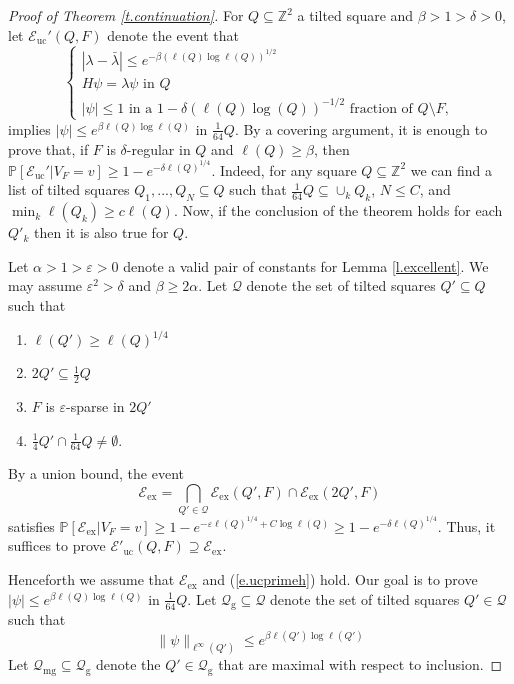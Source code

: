 \documentclass{amsart}
\newcommand{\eref}[1]{(\ref{e.#1})}
\newcommand{\tref}[1]{Theorem \ref{t.#1}}
\newcommand{\lref}[1]{Lemma \ref{l.#1}}
\numberwithin{equation}{section}
\numberwithin{figure}{section}
\newcommand{\Z}{\mathbb{Z}}
\renewcommand{\P}{\mathbb{P}}
\newcommand{\ep}{\varepsilon}
\begin{document}
\begin{proof}[Proof of \tref{continuation}]
For $Q \subseteq \Z^2$ a tilted square and $\beta > 1 > \delta > 0$, let $\mathcal E_{\mathrm{uc}}'(Q,F)$ denote the event that
\begin{equation}
\label{e.ucprimeh}
\begin{cases}
|\lambda - \bar \lambda| \leq e^{-\beta (\ell(Q) \log \ell(Q))^{1/2}} \\
H \psi = \lambda \psi \mbox{ in } Q \\
|\psi| \leq 1 \mbox{ in a $1-\delta (\ell(Q) \log(Q))^{-1/2}$ fraction of $Q \setminus F$},
\end{cases}
\end{equation}
implies $|\psi| \leq e^{\beta \ell(Q) \log \ell(Q)}$ in $\tfrac1{64} Q$.  By a covering argument, it is enough to prove that, if $F$ is $\delta$-regular in $Q$ and $\ell(Q) \geq \beta$, then $\P[\mathcal E_{\mathrm{uc}}' | V_F = v] \geq 1 - e^{-\delta \ell(Q)^{1/4}}$.  Indeed, for any square $Q \subseteq \Z^2$ we can find a list of tilted squares $Q_1, ..., Q_N \subseteq Q$ such that $\tfrac{1}{64} Q \subseteq \cup_k Q_k$, $N \leq C$, and $\min_k \ell(Q_k) \geq c \ell(Q)$.  Now, if the conclusion of the theorem holds for each $Q'_k$ then it is also true for $Q$.

Let $\alpha > 1 > \ep > 0$ denote a valid pair of constants for \lref{excellent}.  We may assume $\ep^2 > \delta$ and $\beta \geq 2 \alpha$.  Let $\mathcal Q$ denote the set of tilted squares $Q' \subseteq Q$ such that 
\begin{enumerate}
\item $\ell(Q') \geq \ell(Q)^{1/4}$
\item $2Q' \subseteq \tfrac12 Q$
\item $F$ is $\ep$-sparse in $2Q'$
\item $\tfrac14 Q' \cap \tfrac{1}{64} Q \neq \emptyset$.
\end{enumerate}
By a union bound, the event
\begin{equation*}
\mathcal E_{\mathrm{ex}} = \bigcap_{Q' \in \mathcal Q} \mathcal E_{\mathrm{ex}}(Q',F) \cap \mathcal E_{\mathrm{ex}}(2Q',F)
\end{equation*}
satisfies $\P[\mathcal E_{\mathrm{ex}} | V_F = v] \geq 1 - e^{-\ep \ell(Q)^{1/4} + C \log \ell(Q)} \geq 1 - e^{-\delta \ell(Q)^{1/4}}$.  Thus, it suffices to prove $\mathcal E'_{\mathrm{uc}}(Q,F) \supseteq \mathcal E_{\mathrm{ex}}$.

Henceforth we assume that $\mathcal E_{\mathrm{ex}}$ and \eref{ucprimeh} hold.  Our goal is to prove $|\psi| \leq e^{\beta \ell(Q) \log \ell(Q)}$ in $\tfrac{1}{64} Q$.  Let $\mathcal Q_{\mathrm{g}} \subseteq \mathcal Q$ denote the set of tilted squares $Q' \in \mathcal Q$ such that
\begin{equation*}
\|\psi\|_{\ell^\infty(Q')} \leq e^{\beta \ell(Q') \log \ell(Q')}
\end{equation*}
Let $\mathcal Q_{\mathrm{mg}} \subseteq \mathcal Q_{\mathrm{g}}$ denote the $Q' \in \mathcal Q_{\mathrm{g}}$ that are maximal with respect to inclusion.


\end{proof}
\end{document}
